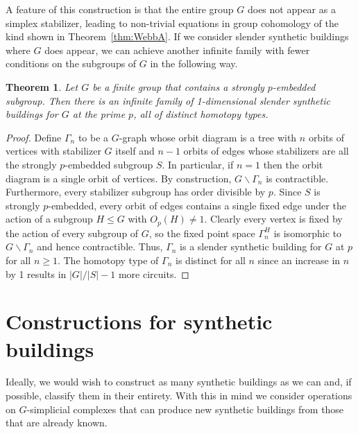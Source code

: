\documentclass[12pt]{amsart}
\theoremstyle{plain}
\newtheorem{theorem}{Theorem}[section]
\theoremstyle{definition}
\theoremstyle{remark}
\numberwithin{equation}{section}
\newcommand{\bs}{\backslash}
\begin{document}
A feature of this construction is that the entire group $G$ does not appear as a simplex stabilizer, leading to non-trivial equations in group cohomology of the kind shown in Theorem~\ref{thm:WebbA}. If we consider slender synthetic buildings where $G$ does appear, we can achieve another infinite family with fewer conditions on the subgroups of $G$ in the following way.
\begin{theorem}
Let $G$ be a finite group that contains a strongly $p$-embedded subgroup. Then there is an infinite family of 1-dimensional slender synthetic buildings for $G$ at the prime $p$, all of distinct homotopy types.
\end{theorem}

\begin{proof}
Define $\Gamma_n$ to be a $G$-graph whose orbit diagram is a tree with $n$ orbits of vertices with stabilizer $G$ itself and $n-1$ orbits of edges whose stabilizers are all the strongly $p$-embedded subgroup $S$. In particular, if $n=1$ then the orbit diagram is a single orbit of vertices. By construction, $G\bs\Gamma_n$ is contractible. Furthermore, every stabilizer subgroup has order divisible by $p$. Since $S$ is strongly $p$-embedded, every orbit of edges contains a single fixed edge under the action of a subgroup $H\leq G$ with $O_p(H)\ne1$. Clearly every vertex is fixed by the action of every subgroup of $G$, so the fixed point space $\Gamma_n^H$ is isomorphic to $G\bs\Gamma_n$ and hence contractible. Thus, $\Gamma_n$ is a slender synthetic building for $G$ at $p$ for all $n\geq1$. The homotopy type of $\Gamma_n$ is distinct for all $n$ since an increase in $n$ by 1 results in $|G|/|S|-1$ more circuits.
\end{proof}


\section{Constructions for synthetic buildings}
\label{constructions-section}
Ideally, we would wish to construct as many synthetic buildings as we can and, if possible, classify them in their entirety. With this in mind we consider operations on $G$-simplicial complexes that can produce new synthetic buildings from those that are already known.
\end{document}
